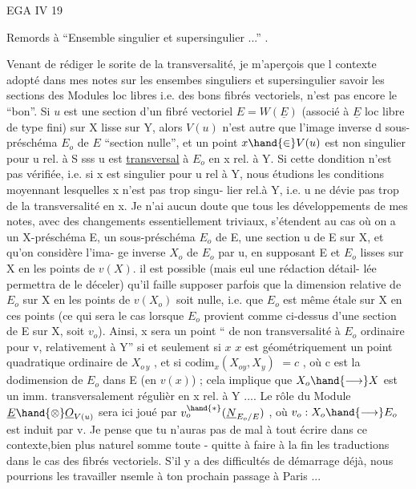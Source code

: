 
EGA IV 19

Remords à ``Ensemble singulier et supersingulier ...'' .

Venant de rédiger le sorite de la transversalité, je m'aperçois que l
contexte adopté dans mes notes sur les ensembes singuliers et supersingulier
savoir les sections des Modules loc libres i.e. des bons fibrés vectoriels,
n'est pas encore le ``bon''. Si $u$ est une section d'un fibré vectoriel
$E = W(\underline{E})$ (associé à $\underline{E}$ loc libre de type fini) sur X lisse sur Y, alors $V(u)$
n'est autre que l'image inverse d  sous-préschéma $E_{o}$ de $E$ ``section nulle'', et un point $x\hand{\in} V(u)$
est non singulier pour u rel. à S sss u est \uline{transversal} à $E_{o}$ en x rel. à Y.
Si cette dondition n'est pas vérifiée, i.e. si x est singulier pour u rel à
Y, nous étudions les conditions moyennant lesquelles x n'est pas trop singu-%
lier rel.à Y, i.e. u ne dévie pas trop de la transversalité en x. Je n'ai
aucun doute que tous les développements de mes notes, avec des changements
essentiellement triviaux, s'étendent au cas où on a un X-préschéma E, un
sous-préschéma $E_{o}$ de E, une section  u de E sur X, et qu'on considère l'ima-%
ge inverse $X_{o}$ de $E_{o}$ par u, en supposant E et $E_{o}$ lisses sur X en les points de $v(X)$. il est possible (mais eul une rédaction détail-%
lée permettra de le déceler) qu'il faille supposer parfois que la dimension
relative de $E_{o}$ sur X en les points de $v(X_{o})$ soit nulle, i.e. que $E_{o}$ est
même étale sur X en ces points (ce qui sera le cas lorsque $E_{o}$ provient comme
ci-dessus d'une section de E sur X, soit $v_{o}$). Ainsi, x sera un point
`` de non transversalité à $E_{o}$ ordinaire pour v, relativement à Y'' si et seulement si $x$  $x$ est
géométriquement un point quadratique ordinaire de $X_{o\,y}$ , et si $\mathrm{codim}_{x}(X_{oy},X_{y})$
$= c$ , où c est la dodimension de $E_{o}$ dans E (en $v(x)$) ; cela implique que
$X_{o}\hand{\longrightarrow} X$ est un imm. transversalement régulièr en x rel. à Y .... Le rôle du Module
$\underline{E}\hand{\otimes}\underline{O}_{V(u)}$ sera ici joué par $v_{o}^{\hand{*}}(\underline{N}_{E_{o}/E})$ , où $v_{o}:X_{o}\hand{\longrightarrow} E_{o}$ est induit par v. Je
pense que tu n'auras pas de mal à tout écrire dans ce contexte,bien plus
naturel somme toute - quitte à faire à la fin les traductions dans le cas
des fibrés vectoriels. S'il y a des difficultés de démarrage déjà, nous
pourrions les travailler nsemle à ton prochain passage à Paris ... 
